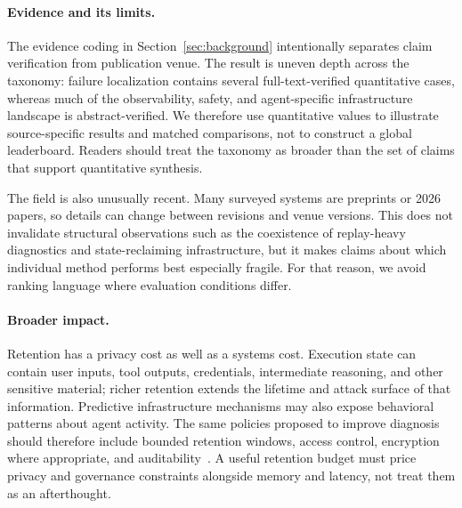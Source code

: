 \paragraph*{Evidence and its limits.}
The evidence coding in Section~\ref{sec:background} intentionally separates claim verification from publication venue. The result is uneven depth across the taxonomy: failure localization contains several full-text-verified quantitative cases, whereas much of the observability, safety, and agent-specific infrastructure landscape is abstract-verified. We therefore use quantitative values to illustrate source-specific results and matched comparisons, not to construct a global leaderboard. Readers should treat the taxonomy as broader than the set of claims that support quantitative synthesis.

The field is also unusually recent. Many surveyed systems are preprints or 2026 papers, so details can change between revisions and venue versions. This does not invalidate structural observations such as the coexistence of replay-heavy diagnostics and state-reclaiming infrastructure, but it makes claims about which individual method performs best especially fragile. For that reason, we avoid ranking language where evaluation conditions differ.

\paragraph*{Broader impact.}
Retention has a privacy cost as well as a systems cost. Execution state can contain user inputs, tool outputs, credentials, intermediate reasoning, and other sensitive material; richer retention extends the lifetime and attack surface of that information. Predictive infrastructure mechanisms may also expose behavioral patterns about agent activity. The same policies proposed to improve diagnosis should therefore include bounded retention windows, access control, encryption where appropriate, and auditability~\cite{auditableagents2026}. A useful retention budget must price privacy and governance constraints alongside memory and latency, not treat them as an afterthought.

